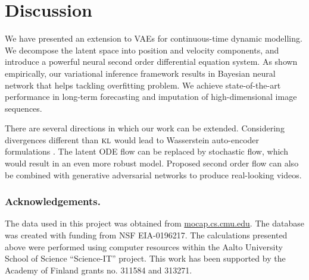 \documentclass{article}
\newcommand{\0}{\mathbf{0}}
\DeclareMathOperator{\KL}{\textsc{kl}}
\begin{document}
\section{Discussion}
We have presented an extension to VAEs for continuous-time dynamic modelling. We decompose the latent space into position and velocity components, and introduce a powerful neural second order differential equation system. As shown empirically, our variational inference framework results in Bayesian neural network that helps tackling overfitting problem. We achieve state-of-the-art performance in long-term forecasting and imputation of high-dimensional image sequences. 

There are several directions in which our work can be extended. Considering divergences different than $\KL$ would lead to Wasserstein auto-encoder formulations \citep{tolstikhin2017wasserstein}. The latent ODE flow can be replaced by stochastic flow, which would result in an even more robust model. Proposed second order flow can also be combined with generative adversarial networks to produce real-looking videos.











\subsubsection*{Acknowledgements.} 
The data used in this project was obtained from \url{mocap.cs.cmu.edu}. The database was created with funding from NSF EIA-0196217. The calculations presented above were performed using computer resources within the Aalto University School of Science “Science-IT” project. This work has been supported by the Academy of Finland grants no. 311584 and 313271.








































\newpage

\end{document}
